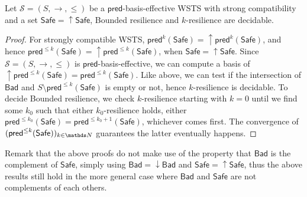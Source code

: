 \documentclass[runningheads]{llncs}
\newcommand{\pred}{\textsf{pred}}
\newcommand{\post}{\textsf{post}}
\newcommand{\Bad}{\textsf{Bad}}
\newcommand{\Safe}{\textsf{Safe}}
\begin{document}
\begin{corollary}
Let $\mathscr{S}=(S,\rightarrow, \leq)$ be a $\pred$-basis-effective WSTS with strong compatibility and a set $\Safe = \mathop{\uparrow} \Safe$, {\sc Bounded resilience} 
and {\sc $k$-resilience} are decidable.
\end{corollary}

\begin{proof}
For strongly compatible WSTS,
$\pred^{k}(\Safe) = \mathop{\uparrow} \pred^{k}(\Safe)$,
and hence
$\pred^{\leq k}(\Safe) = \mathop{\uparrow} \pred^{\leq k}(\Safe)$,
when $\Safe = \mathop{\uparrow} \Safe$. 
Since $\mathscr{S}=(S,\rightarrow, \leq)$ is $\pred$-basis-effective, we can compute a basis of $\mathop{\uparrow} \pred^{\leq k}(\Safe) = \pred^{\leq k}(\Safe)$.
Like above, we can test if the intersection of $\Bad$
and
$S \setminus \pred^{\leq k}(\Safe)$ is empty or not, hence {\sc $k$-resilience} is decidable.
To decide {\sc Bounded resilience}, we check {\sc $k$-resilience}
starting with $k=0$ until we find some $k_0$ such that either {\sc $k_0$-resilience} holds,
either $\pred^{\leq k_0}(\Safe) = \pred^{\leq k_0+1}(\Safe)$, whichever comes first.
The convergence of $(\pred^{\leq k}(\Safe) )_{k\in\N}$ guarantees the latter eventually happens.
\end{proof}


Remark that the above proofs do not make use of the 
property that $\Bad$ is the complement of $\Safe$, simply using
$\Bad=\mathop{\downarrow} \Bad$ and $\Safe=\mathop{\uparrow} \Safe$, thus 
the above results still hold in the more general case where $\Bad$ and $\Safe$ are not complements of each others.


%
%		
\end{document}
